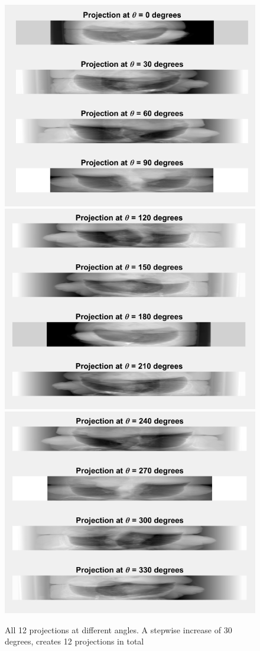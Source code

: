 \documentclass[]{article}
\begin{document}
\begin{figure}[H]
\centering
\includegraphics[scale=0.8]{projections1.png}
\includegraphics[scale=0.8]{projections2.png}
\includegraphics[scale=0.8]{projections3.png}
\caption{All 12 projections at different angles. A stepwise increase of 30 degrees, creates 12 projections in total}
\end{figure}
\end{document}

